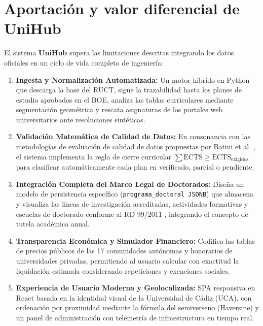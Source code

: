 \section{Aportación y valor diferencial de UniHub}
El sistema \textbf{UniHub} supera las limitaciones descritas integrando los datos oficiales en un ciclo de vida completo de ingeniería:
\begin{enumerate}
    \item \textbf{Ingesta y Normalización Automatizada:} Un motor híbrido en Python que descarga la base del RUCT, sigue la trazabilidad hasta los planes de estudio aprobados en el BOE, analiza las tablas curriculares mediante segmentación geométrica y rescata asignaturas de los portales web universitarios ante resoluciones sintéticas.
    \item \textbf{Validación Matemática de Calidad de Datos:} En consonancia con las metodologías de evaluación de calidad de datos propuestas por Batini et al. \cite{batini2009methodologies}, el sistema implementa la regla de cierre curricular $\sum \text{ECTS} \ge \text{ECTS}_{\text{exigidos}}$ para clasificar automáticamente cada plan en verificado, parcial o pendiente.
    \item \textbf{Integración Completa del Marco Legal de Doctorados:} Diseña un modelo de persistencia específico (\texttt{programa\_doctoral JSONB}) que almacena y visualiza las líneas de investigación acreditadas, actividades formativas y escuelas de doctorado conforme al RD 99/2011 \cite{rd99_2011}, integrando el concepto de tutela académica anual.
    \item \textbf{Transparencia Económica y Simulador Financiero:} Codifica las tablas de precios públicos de las 17 comunidades autónomas y honorarios de universidades privadas, permitiendo al usuario calcular con exactitud la liquidación estimada considerando repeticiones y exenciones sociales.
    \item \textbf{Experiencia de Usuario Moderna y Geolocalizada:} SPA responsiva en React basada en la identidad visual de la Universidad de Cádiz (UCA), con ordenación por proximidad mediante la fórmula del semiverseno (Haversine) y un panel de administración con telemetría de infraestructura en tiempo real.
\end{enumerate}
